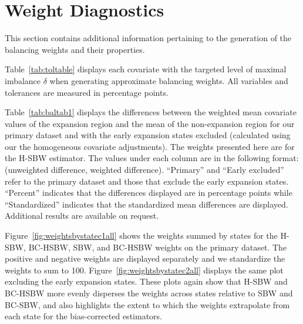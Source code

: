 \section{Weight Diagnostics}\label{app:weightdiagnostics}

This section contains additional information pertaining to the generation of the balancing weights and their properties.

Table~\ref{tab:toltable} displays each covariate with the targeted level of maximal imbalance $\delta$ when generating approximate balancing weights. All variables and tolerances are measured in percentage points.

Table~\ref{tab:baltab1} displays the differences between the weighted mean covariate values of the expansion region and the mean of the non-expansion region for our primary dataset and with the early expansion states excluded (calculated using our the homogeneous covariate adjustments). The weights presented here are for the H-SBW estimator. The values under each column are in the following format: (unweighted difference, weighted difference). ``Primary'' and ``Early excluded'' refer to the primary dataset and those that exclude the early expansion states. ``Percent'' indicates that the differences displayed are in percentage points while ``Standardized'' indicates that the standardized mean differences are displayed. Additional results are available on request.

Figure~\ref{fig:weightsbystatec1all} shows the weights summed by states for the H-SBW, BC-HSBW, SBW, and BC-HSBW weights on the primary dataset. The positive and negative weights are displayed separately and we standardize the weights to sum to 100. Figure~\ref{fig:weightsbystatec2all} displays the same plot excluding the early expansion states. These plots again show that H-SBW and BC-HSBW more evenly disperses the weights across states relative to SBW and BC-SBW, and also highlights the extent to which the weights extrapolate from each state for the bias-corrected estimators.

